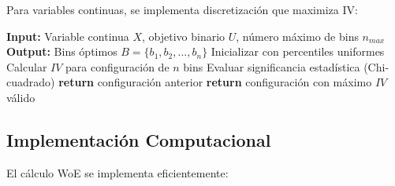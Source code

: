 Para variables continuas, se implementa discretización que maximiza IV:

\begin{algorithm}[H]
\caption{Discretización Optimal para WoE}
\label{alg:optimal_binning}
\begin{algorithmic}
\STATE \textbf{Input:} Variable continua $X$, objetivo binario $U$, número máximo de bins $n_{max}$
\STATE \textbf{Output:} Bins óptimos $B = \{b_1, b_2, ..., b_n\}$
\STATE 
\STATE Inicializar con percentiles uniformes
	\STATE Calcular $IV$ para configuración de $n$ bins
	\STATE Evaluar significancia estadística (Chi-cuadrado)
		\STATE \textbf{return} configuración anterior
	\ENDIF
\ENDFOR
\STATE \textbf{return} configuración con máximo $IV$ válido
\end{algorithmic}
\end{algorithm}

\subsection{Implementación Computacional}

El cálculo WoE se implementa eficientemente:

